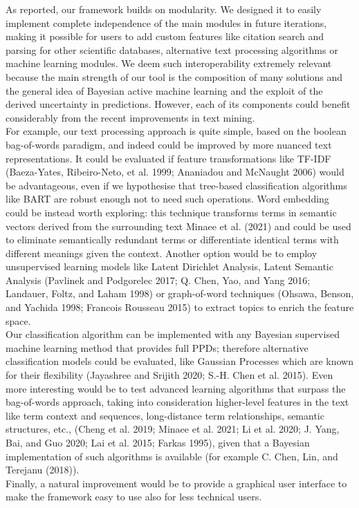 \documentclass{article}
\begin{document}
As reported, our framework builds on modularity. We designed it to
easily implement complete independence of the main modules in future
iterations, making it possible for users to add custom features like
citation search and parsing for other scientific databases, alternative
text processing algorithms or machine learning modules. We deem such
interoperability extremely relevant because the main strength of our
tool is the composition of many solutions and the general idea of
Bayesian active machine learning and the exploit of the derived
uncertainty in predictions. However, each of its components could
benefit considerably from the recent improvements in text mining.\\
For example, our text processing approach is quite simple, based on the
boolean bag-of-words paradigm, and indeed could be improved by more
nuanced text representations. It could be evaluated if feature
transformations like TF-IDF (Baeza-Yates, Ribeiro-Neto, et al. 1999;
Ananiadou and McNaught 2006) would be advantageous, even if we
hypothesise that tree-based classification algorithms like BART are
robust enough not to need such operations. Word embedding could be
instead worth exploring: this technique transforms terms in semantic
vectors derived from the surrounding text Minaee et al. (2021) and could
be used to eliminate semantically redundant terms or differentiate
identical terms with different meanings given the context. Another
option would be to employ unsupervised learning models like Latent
Dirichlet Analysis, Latent Semantic Analysis (Pavlinek and Podgorelec
2017; Q. Chen, Yao, and Yang 2016; Landauer, Foltz, and Laham 1998) or
graph-of-word techniques (Ohsawa, Benson, and Yachida 1998; Francois
Rousseau 2015) to extract topics to enrich the feature space.\\
Our classification algorithm can be implemented with any Bayesian
supervised machine learning method that provides full PPDs; therefore
alternative classification models could be evaluated, like Gaussian
Processes which are known for their flexibility (Jayashree and Srijith
2020; S.-H. Chen et al. 2015). Even more interesting would be to test
advanced learning algorithms that surpass the bag-of-words approach,
taking into consideration higher-level features in the text like term
context and sequences, long-distance term relationships, semantic
structures, etc., (Cheng et al. 2019; Minaee et al. 2021; Li et al.
2020; J. Yang, Bai, and Guo 2020; Lai et al. 2015; Farkas 1995), given
that a Bayesian implementation of such algorithms is available (for
example C. Chen, Lin, and Terejanu (2018)).\\
Finally, a natural improvement would be to provide a graphical user
interface to make the framework easy to use also for less technical
users.
\end{document}
